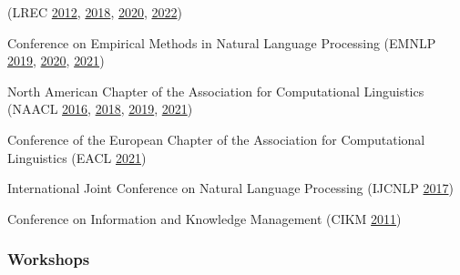 \begin{itemize*}[label={},
                 itemjoin={{,\space}},
                 afterlabel={},
                 after={{.}}]
    \item 
    (LREC 
    \href{https://aclanthology.org/volumes/L12-1/}{2012},
    \href{https://aclanthology.org/L18-1000/}{2018},
    \href{https://aclanthology.org/2020.lrec-1.0.pdf}{2020},
    \href{https://lrec2022.lrec-conf.org/en/committees/scientific-committee/}{2022})
    
    \item Conference on Empirical Methods in Natural Language Processing
    (EMNLP
    \href{https://aclanthology.org/D19-1000.pdf}{2019},
    \href{https://aclanthology.org/2020.emnlp-main.0.pdf}{2020},
    \href{https://aclanthology.org/2021.emnlp-main.0.pdf}{2021})

    \item North American Chapter of the Association for Computational Linguistics 
    (NAACL
    \href{https://aclanthology.org/N16-1000.pdf}{2016},
    \href{https://aclanthology.org/N18-1000.pdf}{2018},
    \href{https://aclanthology.org/N19-1000.pdf}{2019},
    \href{https://aclanthology.org/2021.naacl-main.0.pdf}{2021})

    \item Conference of the European Chapter of the Association for Computational Linguistics
    (EACL 
    \href{https://aclanthology.org/2021.eacl-main.0.pdf}{2021})
    
    \item International Joint Conference on Natural Language Processing
    (IJCNLP 
    \href{https://aclanthology.org/I17-1000.pdf}{2017})

    \item Conference on Information and Knowledge Management
    (CIKM 
    \href{https://dl.acm.org/action/showFmPdf?doi=10.1145%2F2063576}{2011})

    

\end{itemize*}

\subsubsection*{Workshops}

